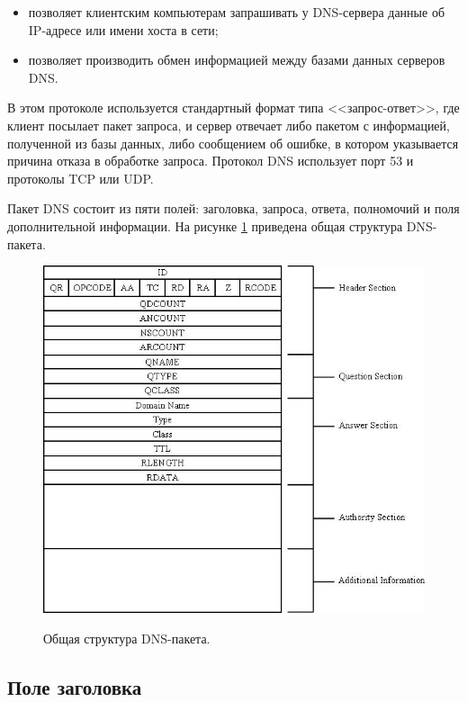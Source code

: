 \begin{itemize}
\item позволяет клиентским компьютерам запрашивать у DNS-сервера данные об IP-адресе или имени хоста в сети;
\item позволяет производить обмен информацией между базами данных серверов DNS\cite{dns}.
\end{itemize}

В этом протоколе используется стандартный формат типа <<запрос-ответ>>, где клиент посылает пакет запроса, и сервер отвечает либо пакетом с информацией, полученной из базы данных, либо сообщением об ошибке, в котором указывается причина отказа в обработке запроса. Протокол DNS использует порт 53 и протоколы TCP или UDP. 

Пакет DNS состоит из пяти полей: заголовка, запроса, ответа, полномочий и поля дополнительной информации. На рисунке \ref{img:DNS} приведена общая структура DNS-пакета.

\clearpage
\begin{figure}[h]
	\centering
	\begin{center}
		{\includegraphics[scale=1]{inc/img/DNS.png}}
		\caption{Общая структура DNS-пакета.}
		\label{img:DNS}
	\end{center}
\end{figure} 

\subsection{Поле заголовка}

